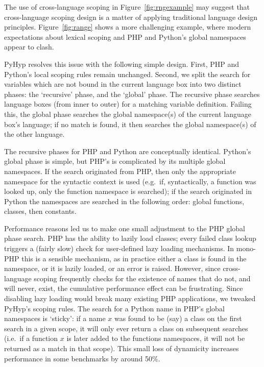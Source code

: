 \documentclass[a4paper,UKenglish]{lipics-v2016}
\newcommand{\ourvm}{PyHyp\xspace}
\begin{document}
The use of cross-language scoping in Figure~\ref{fig:rngexample} may suggest
that cross-language scoping design is a matter of applying traditional language
design principles. Figure~\ref{fig:range} shows a more challenging example,
where modern expectations about lexical scoping and PHP and Python's global
namespaces appear to clash.

\ourvm resolves this issue with the following simple design. First, PHP
and Python's local scoping rules remain unchanged. Second, we split the
search for variables which are not bound in
the current language box into two distinct phases: the `recursive' phase,
and the `global' phase. The recursive phase
searches language boxes (from inner to outer) for a matching
variable definition. Failing this, the global phase searches the
global namespace(s) of the current language box's language; if no match
is found, it then searches the global namespace(s) of the other language.

The recursive phases for PHP and Python are conceptually identical. Python's
global phase is simple, but PHP's is
complicated by its multiple global namespaces. If the search originated from PHP, then
only the appropriate namespace for the syntactic context is used (e.g.~if,
syntactically, a function was looked up, only the function namespace is
searched); if the search originated in Python the namespaces are searched in the
following order: global functions, classes, then constants.

Performance reasons led us to make one small adjustment to the PHP global
phase search. PHP has the ability to lazily load classes; every failed class lookup
triggers a (fairly slow) check for user-defined lazy loading mechanisms. In mono-PHP
this is a sensible mechanism, as in practice either a class is found in the
namespace, or it is lazily loaded, or an error is raised. However, since
cross-language scoping frequently checks for the existence of names that
do not, and will never, exist, the cumulative performance effect
can be frustrating. Since disabling lazy loading would break many existing
PHP applications, we tweaked \ourvm's scoping rules. The search for a Python name in PHP's
global namespaces is `sticky': if a name $x$ was found to be (say) a class on
the first search in a given scope, it will only ever return a class on
subsequent searches (i.e.~if a function $x$ is later added to the functions
namespaces, it will not be returned as a match in that scope). This small
loss of dynamicity increases performance in some benchmarks by around 50\%.
\end{document}
